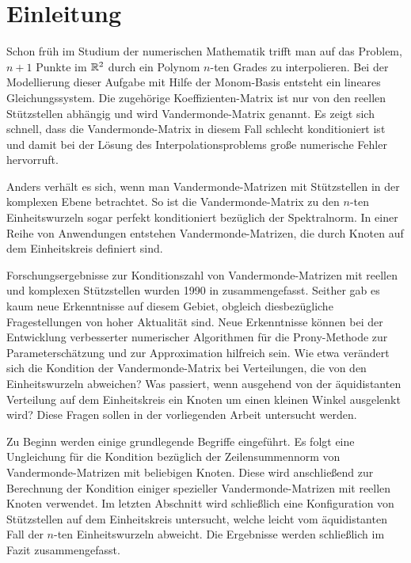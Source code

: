\chapter{Einleitung}


Schon früh im Studium der numerischen Mathematik trifft man auf das Problem,
$n+1$ Punkte im $\mathbb{R}^2$ durch ein Polynom $n$-ten Grades zu interpolieren.  Bei
der Modellierung dieser Aufgabe mit Hilfe der Monom-Basis entsteht ein lineares
Gleichungssystem.  Die zugehörige Koeffizienten-Matrix ist nur von den
reellen Stützstellen abhängig und wird Vandermonde-Matrix genannt.  Es zeigt sich
schnell, dass die Vandermonde-Matrix in diesem Fall schlecht konditioniert ist
und damit bei der Lösung des Interpolationsproblems große numerische Fehler
hervorruft.

Anders verhält es sich, wenn man Vandermonde-Matrizen mit Stützstellen in der
komplexen Ebene betrachtet.  So ist die Vandermonde-Matrix zu den $n$-ten
Einheitswurzeln sogar perfekt konditioniert bezüglich der Spektralnorm.  In
einer Reihe von Anwendungen entstehen Vandermonde-Matrizen, die durch Knoten
auf dem Einheitskreis definiert sind.

Forschungsergebnisse zur Konditionszahl von Vandermonde-Matrizen mit reellen
und komplexen Stützstellen wurden 1990 in \cite{gautschi1} zusammengefasst.
Seither gab es kaum neue Erkenntnisse auf diesem Gebiet, obgleich
diesbezügliche Fragestellungen von hoher Aktualität sind.
Neue Erkenntnisse können bei der Entwicklung verbesserter numerischer
Algorithmen für die Prony-Methode zur Parameterschätzung und zur Approximation
hilfreich sein.
Wie etwa verändert sich die Kondition der Vandermonde-Matrix bei Verteilungen,
die von den Einheitswurzeln abweichen?  Was passiert, wenn ausgehend von der
äquidistanten Verteilung auf dem Einheitskreis ein Knoten um einen kleinen
Winkel ausgelenkt wird?
Diese Fragen sollen in der vorliegenden Arbeit untersucht werden.

Zu Beginn werden einige grundlegende Begriffe eingeführt. Es folgt eine
Ungleichung für die Kondition bezüglich der Zeilensummennorm von
Vandermonde-Matrizen mit beliebigen Knoten.  Diese wird anschließend zur
Berechnung der Kondition einiger spezieller Vandermonde-Matrizen mit reellen
Knoten verwendet.  Im letzten Abschnitt wird schließlich eine Konfiguration von
Stützstellen auf dem Einheitskreis untersucht, welche leicht vom äquidistanten
Fall der $n$-ten Einheitswurzeln abweicht. Die Ergebnisse werden schließlich im
Fazit zusammengefasst.
